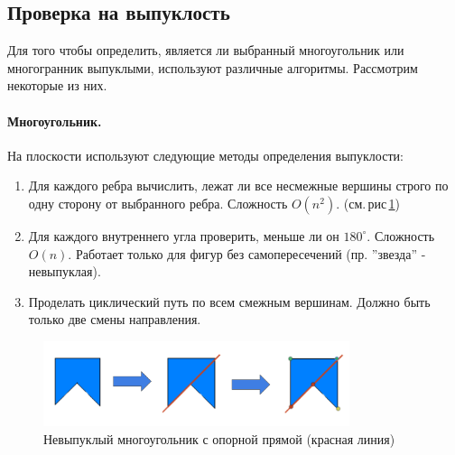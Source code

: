 \documentclass[11pt,a4paper]{extarticle}
\begin{document}
		\subsection{Проверка на выпуклость}
			Для того чтобы определить, является ли выбранный многоугольник или многогранник выпуклыми, используют различные алгоритмы. Рассмотрим некоторые из них.
			\paragraph{Многоугольник.} На плоскости используют следующие методы определения выпуклости:
			\begin{enumerate}
				\item Для каждого ребра вычислить, лежат ли все несмежные вершины строго по одну сторону от выбранного ребра. Сложность $O(n^2)$. (см.\,рис\,\ref{con_polygon})
				\item Для каждого внутреннего угла проверить, меньше ли он $180^{\circ}$. Сложность $O(n)$. Работает только для фигур без самопересечений (пр. ''звезда'' - невыпуклая).
				\item Проделать циклический путь по всем смежным вершинам. Должно быть только две смены направления.  
			\end{enumerate}

			\begin{figure}[ht]
				\centering
				\includegraphics[width=0.8\textwidth]{con_polygon}
				\caption{Невыпуклый многоугольник с опорной прямой (красная линия)}
				\label{con_polygon}				
			\end{figure}
\end{document}
